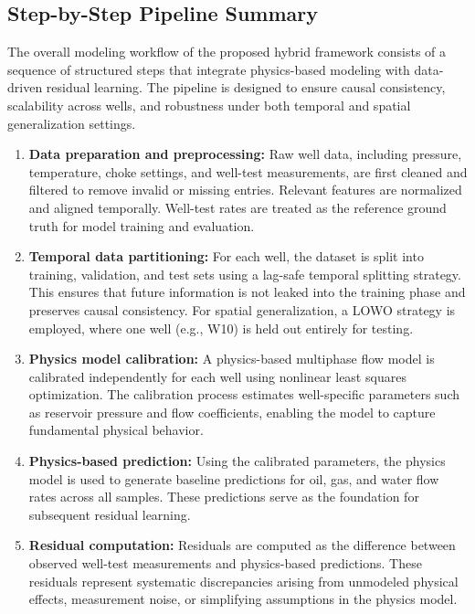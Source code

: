 \documentclass[12pt,APA]{uomthesis}
\begin{document}
\subsection{Step-by-Step Pipeline Summary}
\label{subsec:pipeline_summary}
The overall modeling workflow of the proposed hybrid framework consists of a sequence of structured steps that integrate physics-based modeling with data-driven residual learning. The pipeline is designed to ensure causal consistency, scalability across wells, and robustness under both temporal and spatial generalization settings.

\begin{enumerate}

\item \textbf{Data preparation and preprocessing:}  
Raw well data, including pressure, temperature, choke settings, and well-test measurements, are first cleaned and filtered to remove invalid or missing entries. Relevant features are normalized and aligned temporally. Well-test rates are treated as the reference ground truth for model training and evaluation.

\item \textbf{Temporal data partitioning:}  
For each well, the dataset is split into training, validation, and test sets using a lag-safe temporal splitting strategy. This ensures that future information is not leaked into the training phase and preserves causal consistency. For spatial generalization, a LOWO strategy is employed, where one well (e.g., W10) is held out entirely for testing.

\item \textbf{Physics model calibration:}  
A physics-based multiphase flow model is calibrated independently for each well using nonlinear least squares optimization. The calibration process estimates well-specific parameters such as reservoir pressure and flow coefficients, enabling the model to capture fundamental physical behavior.

\item \textbf{Physics-based prediction:}  
Using the calibrated parameters, the physics model is used to generate baseline predictions for oil, gas, and water flow rates across all samples. These predictions serve as the foundation for subsequent residual learning.

\item \textbf{Residual computation:}  
Residuals are computed as the difference between observed well-test measurements and physics-based predictions. These residuals represent systematic discrepancies arising from unmodeled physical effects, measurement noise, or simplifying assumptions in the physics model.


\end{enumerate}
\end{document}
